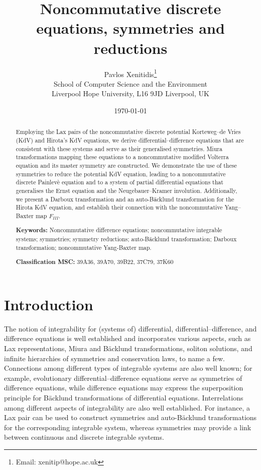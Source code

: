 \documentclass[dvips,10pt]{article}
\title{Noncommutative discrete equations, symmetries and reductions}
\author{Pavlos Xenitidis\footnote{Email: xenitip@hope.ac.uk}\\ School of Computer Science and the Environment\\ Liverpool Hope University, L16 9JD  Liverpool, UK}
\date{\today}
\theoremstyle{remark} %
\begin{document}
	
	\maketitle
	\begin{abstract}
	Employing the Lax pairs of the noncommutative discrete potential Korteweg--de Vries (KdV) and Hirota's KdV equations, we derive differential--difference equations that are consistent with these systems and serve as their generalised symmetries. Miura transformations mapping these equations to a noncommutative modified Volterra equation and its master symmetry are constructed. We demonstrate the use of these symmetries to reduce the potential KdV equation, leading to a noncommutative discrete Painlev{\`{e}} equation and to a system of partial differential equations that generalises the Ernst equation and the Neugebauer--Kramer involution. Additionally, we present a Darboux transformation and an auto-B\"acklund transformation for the Hirota KdV equation, and establish their connection with the noncommutative Yang--Baxter map $F_{III}$.
	
		
		{\bf{Keywords:}} Noncommutative difference equations; noncommutative integrable systems; symmetries; symmetry reductions; auto-B\"acklund transformation; Darboux transformation; noncommutative Yang-Baxter map.
		
		{\bf{Classification MSC:}} 39A36, 39A70, 39B22, 37C79, 37K60
		
		
	\end{abstract}
	
	
	\section{Introduction}
		
	The notion of integrability for (systems of) differential, differential--difference, and difference equations is well established and incorporates various aspects, such as Lax representations, Miura and B\"acklund transformations, soliton solutions, and infinite hierarchies of symmetries and conservation laws, to name a few. Connections among different types of integrable systems are also well known; for example, evolutionary differential--difference equations serve as symmetries of difference equations, while difference equations may express the superposition principle for B\"acklund transformations of differential equations. Interrelations among different aspects of integrability are also well established. For instance, a Lax pair can be used to construct symmetries and auto-B\"acklund transformations for the corresponding integrable system, whereas symmetries may provide a link between continuous and discrete integrable systems. 
	
\end{document}
